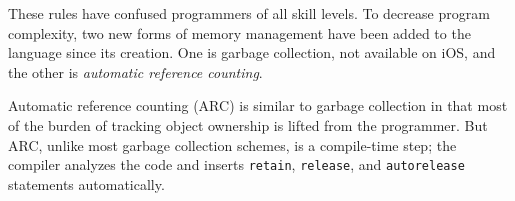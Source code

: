 These rules have confused programmers of all skill levels. To decrease program
complexity, two new forms of memory management have been added to the language
since its creation. One is garbage collection, not available on iOS, and the
other is \emph{automatic reference counting}.

Automatic reference counting (ARC) is similar to garbage collection in that most
of the burden of tracking object ownership is lifted from the programmer. But
ARC, unlike most garbage collection schemes, is a compile-time step; the
compiler analyzes the code and inserts \texttt{retain}, \texttt{release}, and
\texttt{autorelease} statements automatically.
